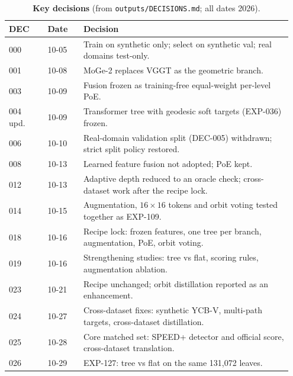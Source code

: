 \begin{table}[t]
  \centering\footnotesize
  \setlength{\tabcolsep}{2.5pt}
  \caption{\textbf{Key decisions} (from \texttt{outputs/DECISIONS.md}; all dates 2026).}
  \label{app:z_tab_dec}
  \begin{tabular}{@{}p{0.13\linewidth}p{0.12\linewidth}p{0.70\linewidth}@{}}
    \toprule
    \raggedright DEC & \raggedright Date & \raggedright Decision\tabularnewline
    \midrule
    \raggedright 000 & \raggedright 10-05 & \raggedright Train on synthetic only; select on synthetic val; real domains test-only.\tabularnewline
    \raggedright 001 & \raggedright 10-08 & \raggedright MoGe-2 replaces VGGT as the geometric branch.\tabularnewline
    \raggedright 003 & \raggedright 10-09 & \raggedright Fusion frozen as training-free equal-weight per-level PoE.\tabularnewline
    \raggedright 004 upd. & \raggedright 10-09 & \raggedright Transformer tree with geodesic soft targets (EXP-036) frozen.\tabularnewline
    \raggedright 006 & \raggedright 10-10 & \raggedright Real-domain validation split (DEC-005) withdrawn; strict split policy restored.\tabularnewline
    \raggedright 008 & \raggedright 10-13 & \raggedright Learned feature fusion not adopted; PoE kept.\tabularnewline
    \raggedright 012 & \raggedright 10-13 & \raggedright Adaptive depth reduced to an oracle check; cross-dataset work after the recipe lock.\tabularnewline
    \raggedright 014 & \raggedright 10-15 & \raggedright Augmentation, $16\times16$ tokens and orbit voting tested together as EXP-109.\tabularnewline
    \raggedright 018 & \raggedright 10-16 & \raggedright Recipe lock: frozen features, one tree per branch, augmentation, PoE, orbit voting.\tabularnewline
    \raggedright 019 & \raggedright 10-16 & \raggedright Strengthening studies: tree vs flat, scoring rules, augmentation ablation.\tabularnewline
    \raggedright 023 & \raggedright 10-21 & \raggedright Recipe unchanged; orbit distillation reported as an enhancement.\tabularnewline
    \raggedright 024 & \raggedright 10-27 & \raggedright Cross-dataset fixes: synthetic YCB-V, multi-path targets, cross-dataset distillation.\tabularnewline
    \raggedright 025 & \raggedright 10-28 & \raggedright Core matched set: SPEED+ detector and official score, cross-dataset translation.\tabularnewline
    \raggedright 026 & \raggedright 10-29 & \raggedright EXP-127: tree vs flat on the same 131,072 leaves.\tabularnewline
    \bottomrule
  \end{tabular}
\end{table}

